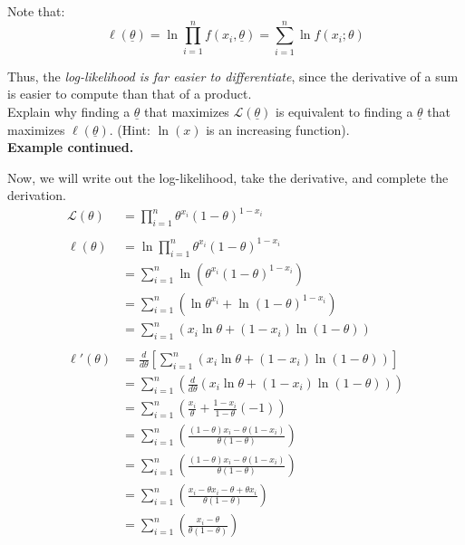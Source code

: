 	Note that: 
	\[
	\ell(\underline{\theta}) = 
	\ln \prod_{i=1}^n f(x_i, \underline{\theta}) =
	\sum_{i=1}^n \ln f(x_i;\theta)
	\]

	Thus, the \textit{log-likelihood is far easier to differentiate}, since the derivative of a sum is easier to compute than that of a product.\\

	\exercise Explain why finding a $\underline{\theta}$ that maximizes $\mathcal{L}(\underline{\theta})$ is equivalent to finding a $\underline{\theta}$ that maximizes $\ell(\underline{\theta})$. (Hint: $\ln(x)$ is an increasing function).\\

\textbf{Example continued. }

Now, we will write out the log-likelihood, take the derivative, and complete the derivation.
\begin{align*}
	\mathcal{L}(\theta) &= \prod_{i=1}^n \theta^{x_i} (1-\theta)^{1-x_i} \\
			    & \\
	\ell(\theta) 
	&= \ln \prod_{i=1}^n \theta^{x_i} (1-\theta)^{1-x_i} \\
	&= \sum_{i=1}^n \ln\left( \theta^{x_i} (1-\theta)^{1-x_i} \right)\\
	&= \sum_{i=1}^n \left( \ln\theta^{x_i}  + \ln (1-\theta)^{1-x_i} \right)\\
	&= \sum_{i=1}^n \left( x_i \ln\theta  +  (1-x_i)\ln (1-\theta) \right)\\
	& \\
	\ell'(\theta) 
	&= \frac{d}{d\theta} \left[\sum_{i=1}^n \left( x_i \ln\theta  +  (1-x_i)\ln (1-\theta) \right)\right]\\
	&= \sum_{i=1}^n \left(
		\frac{d}{d\theta}\left(
			x_i \ln\theta  +  (1-x_i)\ln (1-\theta)
		\right)
	\right)\\
	&= \sum_{i=1}^n \left(
			\frac{x_i}{\theta}  +  \frac{1-x_i}{1-\theta}(-1)
	\right)\\
	&= \sum_{i=1}^n \left(
			\frac{(1-\theta)x_i - \theta(1-x_i)}{\theta(1-\theta)}  
	\right)\\
	&= \sum_{i=1}^n \left(
			\frac{(1-\theta)x_i - \theta(1-x_i)}{\theta(1-\theta)}  
	\right)\\
	&= \sum_{i=1}^n \left(
			\frac{x_i - \theta x_i - \theta + \theta x_i}{\theta(1-\theta)}  
	\right)\\
	&= \sum_{i=1}^n \left(
			\frac{x_i - \theta}{\theta(1-\theta)}  
	\right)
\end{align*}

